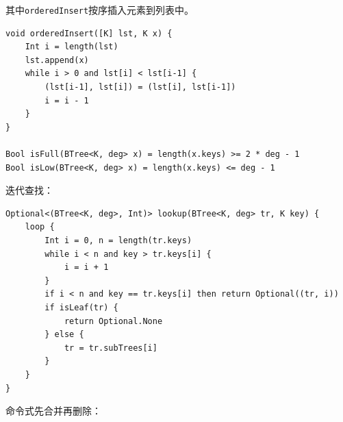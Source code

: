 \documentclass{ctexart}
\begin{document}
其中\texttt{orderedInsert}按序插入元素到列表中。

\begin{lstlisting}[language = Bourbaki]
void orderedInsert([K] lst, K x) {
    Int i = length(lst)
    lst.append(x)
    while i > 0 and lst[i] < lst[i-1] {
        (lst[i-1], lst[i]) = (lst[i], lst[i-1])
        i = i - 1
    }
}

Bool isFull(BTree<K, deg> x) = length(x.keys) >= 2 * deg - 1
Bool isLow(BTree<K, deg> x) = length(x.keys) <= deg - 1
\end{lstlisting}

迭代查找：

\begin{lstlisting}[language = Bourbaki]
Optional<(BTree<K, deg>, Int)> lookup(BTree<K, deg> tr, K key) {
    loop {
        Int i = 0, n = length(tr.keys)
        while i < n and key > tr.keys[i] {
            i = i + 1
        }
        if i < n and key == tr.keys[i] then return Optional((tr, i))
        if isLeaf(tr) {
            return Optional.None
        } else {
            tr = tr.subTrees[i]
        }
    }
}
\end{lstlisting}

命令式先合并再删除：
\end{document}

